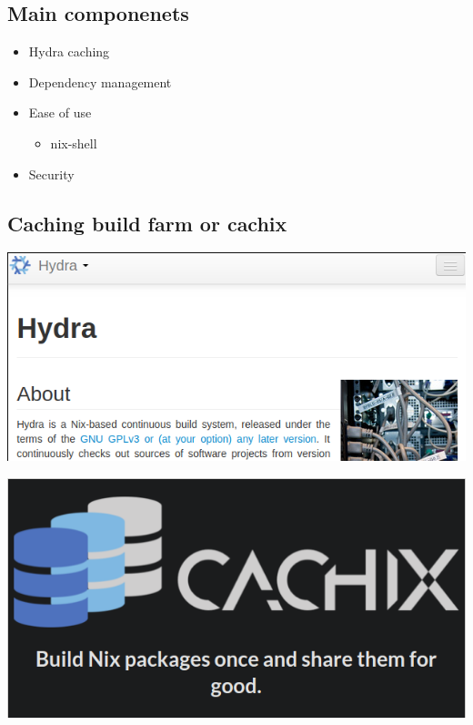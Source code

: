 \documentclass[11pt]{article}
\begin{document}
\subsection{Main componenets}
\label{sec:orga5af4ba}
\begin{itemize}
\item Hydra caching
\item Dependency management
\item Ease of use
\begin{itemize}
\item nix-shell
\end{itemize}
\item Security
\end{itemize}
\subsection{Caching build farm or cachix}
\label{sec:org39ace42}
\begin{center}
\includegraphics[width=.9\linewidth]{./images/screenshot-10.png}
\end{center}
\begin{center}
\includegraphics[width=.9\linewidth]{./images/screenshot-11.png}
\end{center}
\end{document}
